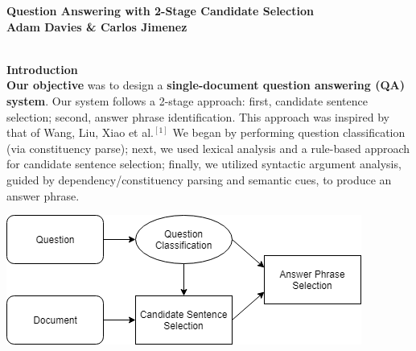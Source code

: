 \documentclass[a1,landscape]{a0poster}
\begin{document}
\begin{minipage}[c]{0.9\linewidth}
\centering
\Huge \color{NavyBlue} \textbf{Question Answering with 2-Stage Candidate Selection} \color{Black}\\ %
\LARGE \textbf{Adam Davies \& Carlos Jimenez}\\ %
\end{minipage}



\begin{multicols}{3} %
\Large

\color{SaddleBrown} %

\textbf{\LARGE \\Introduction}\\
\textbf{Our objective} was to design a \textbf{single-document question answering (QA) system}. Our system follows a 2-stage approach: first, candidate sentence selection; second, answer phrase identification. This approach was inspired by that of Wang, Liu, Xiao et al.$^{[1]}$ We began by performing question classification (via constituency parse); next, we used lexical analysis and a rule-based approach for candidate sentence selection; finally, we utilized syntactic argument analysis, guided by dependency/constituency parsing and semantic cues, to produce an answer phrase.

\vspace{1ex}
\includegraphics[scale=1.5]{diagram-simple.png}


\end{multicols}
\end{document}
